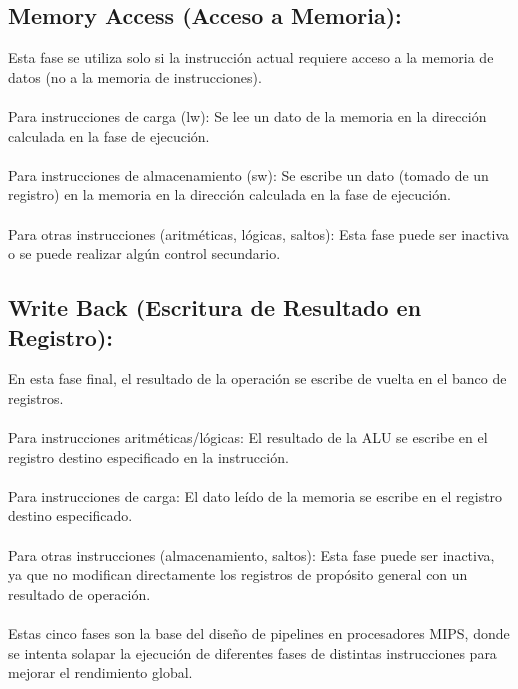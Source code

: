 \documentclass{article}
\begin{document}
\subsection{Memory Access (Acceso a Memoria):}
Esta fase se utiliza solo si la instrucción actual requiere acceso a la memoria de datos (no a la memoria de instrucciones).
\\
\\ Para instrucciones de carga (lw): Se lee un dato de la memoria en la dirección calculada en la fase de ejecución.
\\
\\Para instrucciones de almacenamiento (sw): Se escribe un dato (tomado de un registro) en la memoria en la dirección calculada en la fase de ejecución.
\\
\\ Para otras instrucciones (aritméticas, lógicas, saltos): Esta fase puede ser inactiva o se puede realizar algún control secundario.

\subsection{Write Back (Escritura de Resultado en Registro):}
En esta fase final, el resultado de la operación se escribe de vuelta en el banco de registros.
\\
\\Para instrucciones aritméticas/lógicas: El resultado de la ALU se escribe en el registro destino especificado en la instrucción.
\\
\\Para instrucciones de carga: El dato leído de la memoria se escribe en el registro destino especificado.
\\
\\Para otras instrucciones (almacenamiento, saltos): Esta fase puede ser inactiva, ya que no modifican directamente los registros de propósito general con un resultado de operación.
\\
\\Estas cinco fases son la base del diseño de pipelines en procesadores MIPS, donde se intenta solapar la ejecución de diferentes fases de distintas instrucciones para mejorar el rendimiento global.
\end{document}
